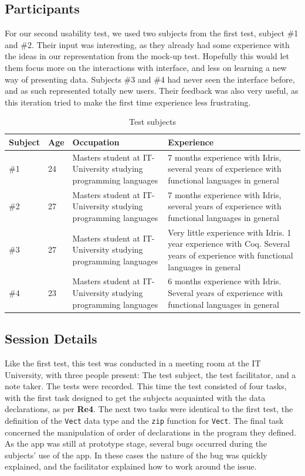 \subsection{Participants}
For our second usability test, we used two subjects from the first test,
subject \#1 and \#2. Their input was interesting, as they already had some
experience with the ideas in our representation from the mock-up test.
Hopefully this would let them focus more on the interactions with interface,
and less on learning a new way of presenting data. Subjects \#3 and \#4 had
never seen the interface before, and as such represented totally new users.
Their feedback was also very useful, as this iteration tried to make the first
time experience less frustrating.

\begin{table}[ht]
\centering
\begin{tabular}{| l | l | p{5cm} | p{5cm} |}
\hline
Subject & Age & Occupation & Experience \\ \hline
\#1 & 24 & Masters student at IT-University studying programming languages & 7 months experience with Idris, several years of experience with functional languages in general \\ \hline
\#2 & 27 & Masters student at IT-University studying programming languages & 7 months experience with Idris, several years of experience with functional languages in general \\ \hline
\#3 & 27 & Masters student at IT-University studying programming languages & Very little experience with Idris. 1 year experience with Coq. Several years of experience with functional languages in general \\ \hline
\#4 & 23 & Masters student at IT-University studying programming languages & 6 months experience with Idris. Several years of experience with functional languages in general \\ \hline
\end{tabular}
\caption{Test subjects}
\label{table:second_test_subjects}
\end{table}

\subsection{Session Details}
Like the first test, this test was conducted in a meeting room at the IT
University, with three people present: The test subject, the test facilitator,
and a note taker. The tests were recorded. This time the test consisted of four
tasks, with the first task designed to get the subjects acquainted with the
data declarations, as per \textbf{Re4}. The next two tasks were identical to the first test, the
definition of the \texttt{Vect} data type and the \texttt{zip} function for
\texttt{Vect}. The final task concerned the manipulation of order of
declarations in the program they defined. As the app was still at prototype
stage, several bugs occurred during the subjects' use of the app. In these
cases the nature of the bug was quickly explained, and the facilitator
explained how to work around the issue.

